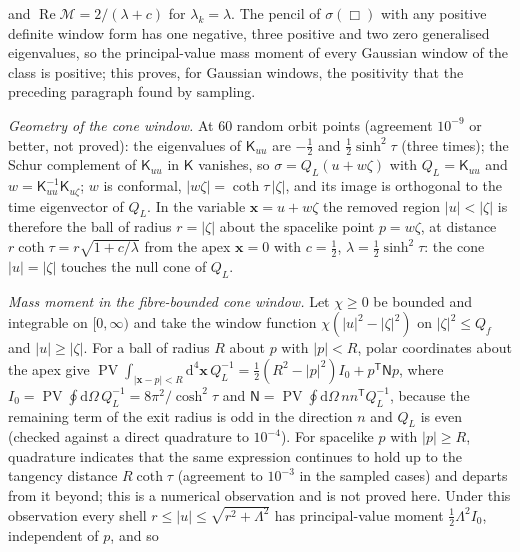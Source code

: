 and \(\operatorname{Re}\mathcal M=2/(\lambda+c)\) for \(\lambda_k=\lambda\). The pencil of \(\sigma(\Box)\) with any positive definite window form has one negative, three positive and two zero generalised eigenvalues, so the principal-value mass moment of every Gaussian window of the class is positive; this proves, for Gaussian windows, the positivity that the preceding paragraph found by sampling.



\emph{Geometry of the cone window.} At \(60\) random orbit points (agreement \(10^{-9}\) or better, not proved): the eigenvalues of \(\mathsf K_{uu}\) are \(-\tfrac12\) and \(\tfrac12\sinh^2\tau\) (three times); the Schur complement of \(\mathsf K_{uu}\) in \(\mathsf K\) vanishes, so \(\sigma=Q_L(u+w\zeta)\) with \(Q_L=\mathsf K_{uu}\) and \(w=\mathsf K_{uu}^{-1}\mathsf K_{u\zeta}\); \(w\) is conformal, \(|w\zeta|=\coth\tau\,|\zeta|\), and its image is orthogonal to the time eigenvector of \(Q_L\). In the variable \(\boldsymbol x=u+w\zeta\) the removed region \(|u|<|\zeta|\) is therefore the ball of radius \(r=|\zeta|\) about the spacelike point \(p=w\zeta\), at distance \(r\coth\tau=r\sqrt{1+c/\lambda}\) from the apex \(\boldsymbol x=0\) with \(c=\tfrac12\), \(\lambda=\tfrac12\sinh^2\tau\): the cone \(|u|=|\zeta|\) touches the null cone of \(Q_L\).



\emph{Mass moment in the fibre-bounded cone window.} Let \(\chi\ge0\) be bounded and integrable on \([0,\infty)\) and take the window function \(\chi(|u|^2-|\zeta|^2)\) on \(|\zeta|^2\le Q_f\) and \(|u|\ge|\zeta|\). For a ball of radius \(R\) about \(p\) with \(|p|<R\), polar coordinates about the apex give \(\operatorname{PV}\!\int_{|\boldsymbol x-p|<R}\mathrm d^4\boldsymbol x\,Q_L^{-1}=\tfrac12(R^2-|p|^2)I_0+p^{\mathsf T}\mathsf Np\), where \(I_0=\operatorname{PV}\oint\mathrm d\Omega\,Q_L^{-1}=8\pi^2/\cosh^2\tau\) and \(\mathsf N=\operatorname{PV}\oint\mathrm d\Omega\,nn^{\mathsf T}Q_L^{-1}\), because the remaining term of the exit radius is odd in the direction \(n\) and \(Q_L\) is even (checked against a direct quadrature to \(10^{-4}\)). For spacelike \(p\) with \(|p|\ge R\), quadrature indicates that the same expression continues to hold up to the tangency distance \(R\coth\tau\) (agreement to \(10^{-3}\) in the sampled cases) and departs from it beyond; this is a numerical observation and is not proved here. Under this observation every shell \(r\le|u|\le\sqrt{r^2+\Lambda^2}\) has principal-value moment \(\tfrac12\Lambda^2I_0\), independent of \(p\), and so

